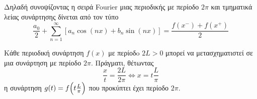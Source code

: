 \begin{rem}
  Δηλαδή συνοψίζοντας η σειρά Fourier μιας περιοδικής με περίοδο $ 2 \pi $ και 
  τμηματικά λείας συνάρτησης δίνεται από τον τύπο 
  \[
    \frac{a_{0}}{2} + \sum_{n=1}^{\infty} [a_{n} \cos{(nx)} + b_{n} \sin{(nx)}] =  
    \frac{f(x^{-}) + f(x^{+})}{2} 
  \] 
\end{rem}




\begin{rem}
    Κάθε περιοδική συνάρτηση $ f(x) $ με περίοδo $ 2L>0 $ μπορεί να 
    μετασχηματιστεί σε μια συνάρτηση με περίοδο $ 2 \pi $. Πράγματι, θέτωντας 
    \[ 
        \frac{x}{t} = \frac{2L}{2 \pi} \Leftrightarrow x= t \frac{L}{\pi} 
    \]
    η συνάρτηση $ g(t) = f\Bigl(t \frac{L}{\pi}\Bigr) $ που προκύπτει 
    έχει περίοδο $ 2 \pi $.
\end{rem}

